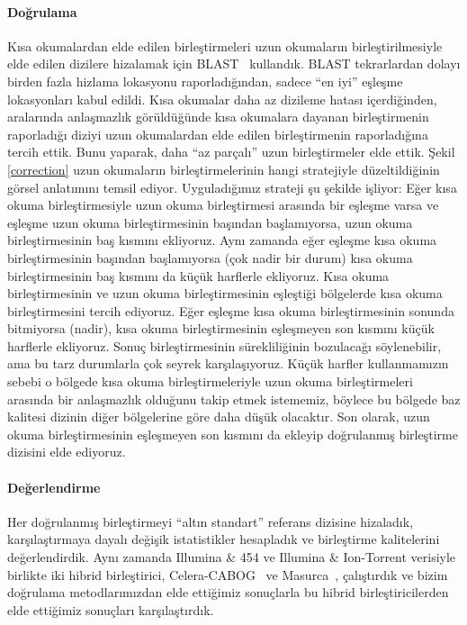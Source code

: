 \paragraph{Doğrulama} 
Kısa okumalardan elde edilen birleştirmeleri uzun okumaların birleştirilmesiyle elde edilen dizilere hizalamak için BLAST~\cite{Altschul1990} kullandık.
BLAST tekrarlardan dolayı birden fazla hizlama lokasyonu raporladığından, sadece ``en iyi'' eşleşme lokasyonları kabul edildi.
Kısa okumalar daha az dizileme hatası içerdiğinden, aralarında anlaşmazlık görüldüğünde kısa okumalara dayanan birleştirmenin raporladığı diziyi uzun okumalardan elde edilen birleştirmenin raporladığına tercih ettik.
Bunu yaparak, daha ``az parçalı'' uzun birleştirmeler elde ettik. Şekil \ref{correction} uzun okumaların birleştirmelerinin hangi stratejiyle düzeltildiğinin görsel anlatımını temsil ediyor. 
Uyguladığımız strateji şu şekilde işliyor: Eğer kısa okuma birleştirmesiyle uzun okuma birleştirmesi arasında bir eşleşme varsa ve eşleşme uzun okuma birleştirmesinin başından başlamıyorsa, uzun okuma birleştirmesinin baş kısmını ekliyoruz.
Aynı zamanda eğer eşleşme kısa okuma birleştirmesinin başından başlamıyorsa (çok nadir bir durum) kısa okuma birleştirmesinin baş kısmını da küçük harflerle ekliyoruz. 
Kısa okuma birleştirmesinin ve uzun okuma birleştirmesinin eşleştiği bölgelerde kısa okuma birleştirmesini tercih ediyoruz. 
Eğer eşleşme kısa okuma birleştirmesinin sonunda bitmiyorsa (nadir), kısa okuma birleştirmesinin eşleşmeyen son kısmını küçük harflerle ekliyoruz.
Sonuç birleştirmesinin sürekliliğinin bozulacağı söylenebilir, ama bu tarz durumlarla çok seyrek karşılaşıyoruz.
Küçük harfler kullanmamızın sebebi o bölgede kısa okuma birleştirmeleriyle uzun okuma birleştirmeleri arasında bir anlaşmazlık olduğunu takip etmek istememiz, böylece bu bölgede baz kalitesi dizinin diğer bölgelerine göre daha düşük olacaktır.
Son olarak, uzun okuma birleştirmesinin eşleşmeyen son kısmını da ekleyip doğrulanmış birleştirme dizisini elde ediyoruz.  

\paragraph{Değerlendirme}
Her doğrulanmış birleştirmeyi ``altın standart'' referans dizisine  hizaladık, karşılaştırmaya dayalı değişik istatistikler hesapladık ve birleştirme kalitelerini değerlendirdik.
Aynı zamanda Illumina \& 454 ve Illumina \& Ion-Torrent verisiyle birlikte iki hibrid birleştirici, Celera-CABOG~\cite{Miller2008} ve Masurca~\cite{Zimin2013}, çalıştırdık ve bizim doğrulama metodlarımızdan elde ettiğimiz sonuçlarla bu hibrid birleştiricilerden elde ettiğimiz sonuçları karşılaştırdık.

